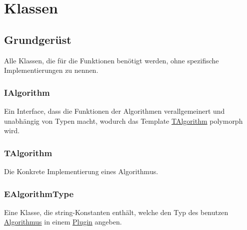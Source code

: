 \section{Klassen}

\subsection{Grundgerüst}
Alle Klassen, die für die Funktionen benötigt werden, ohne spezifische Implementierungen zu nennen.
\subsubsection{IAlgorithm}\label{Workflow:IAlgorithm}
Ein Interface, dass die Funktionen der Algorithmen verallgemeinert und unabhängig von Typen macht, wodurch das Template \hyperref[Workflow:TAlgorithm]{TAlgorithm} polymorph wird.
\beginMembers
{}
\closeMembers

\subsubsection{TAlgorithm}\label{Workflow:TAlgorithm}
Die Konkrete Implementierung eines Algorithmus.
\beginMembers
{}
\closeMembers

\subsubsection{EAlgorithmType}
Eine Klasse, die string-Konstanten enthält, welche den Typ des benutzen \hyperref[Workflow:IAlgorithm]{Algorithmus} in einem \hyperref[Workflow:APlugin]{Plugin} angeben.
\beginMembersSmall
{}
\closeMembers

